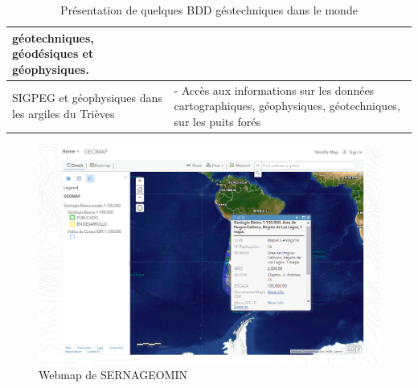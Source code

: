 \begin{table}
\begin{tabular}{|p{0.40\linewidth}|p{0.60\linewidth}|}
                        géotechniques, géodésiques et géophysiques.
                       \\
                \hline 
                SIGPEG
                et géophysiques dans les argiles du Trièves&
                        - Accès aux informations sur les données
                        cartographiques, géophysiques, géotechniques, sur les puits forés
                            \\
                \hline 
        \end{tabular}
        \caption{Présentation de quelques BDD géotechniques dans le monde} \label{tab:someBDD}
\end{table}
\par

\begin{figure}[t]
    \centering
    \includegraphics[width=1\textwidth]{images/Contexte/chili.png}
    \caption{Webmap de SERNAGEOMIN}
    \label{fig:chili}
\end{figure}
